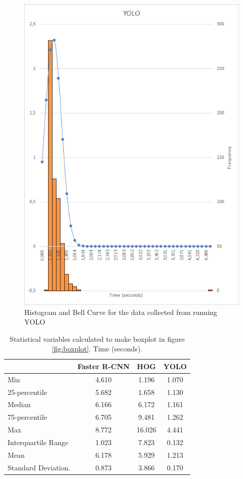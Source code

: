 \begin{figure}[!hbt]
\begin{minipage}{.47\textwidth}
\includegraphics[width=\textwidth]{src/imgs/YOLO_graph.png}
\caption[YOLO Histogram]{Histogram and Bell Curve for the data collected from running YOLO}
\label{fig:yolo}
\end{minipage}
\end{figure}

\begin{table}[!hbt]
\centering
\begin{tabular}{|l|c|c|c|}\hline
&Faster R-CNN&HOG&YOLO\\\hline
Min&4.610&1.196&1.070\\\hline
25-percentile&5.682&1.658&1.130\\\hline
Median&6.166&6.172&1.161\\\hline
75-percentile&6.705&9.481&1.262\\\hline
Max&8.772&16.026&4.441\\\hline
Interquartile Range&1.023&7.823&0.132\\\hline
Mean&6.178&5.929&1.213\\\hline
Standard Deviation.&0.873&3.866&0.170\\\hline
\end{tabular}
\caption[Statistical Variables]{Statistical variables calculated to make boxplot in figure \ref{fig:boxplot}. Time (seconds).}
\label{tab:statistics}
\end{table}


